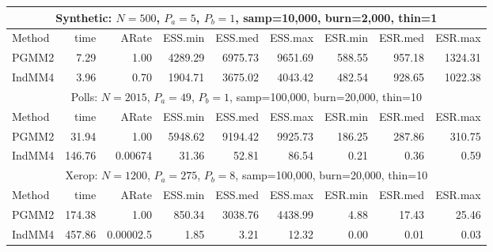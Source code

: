 \documentclass[11pt]{article}
\newcommand{\tablesize}{\small}
\begin{document}
\begin{table}
\tablesize
\centering
\label{tab:mm-examples}
\begin{tabular}{l r r r r r r r r } 
\hline
\multicolumn{9}{c}{Synthetic: $N=500$, $P_a=5$, $P_b=1$, samp=10,000, burn=2,000, thin=1} \\
\hline
Method  &     time &    ARate &  ESS.min &  ESS.med &  ESS.max &  ESR.min &  ESR.med &  ESR.max \\ 
PGMM2   &     7.29 &     1.00 &  4289.29 &  6975.73 &  9651.69 &   588.55 &   957.18 &  1324.31 \\ 
IndMM4  &     3.96 &     0.70 &  1904.71 &  3675.02 &  4043.42 &   482.54 &   928.65 &  1022.38 \\

\hline
\multicolumn{9}{c}{Polls: $N=2015$, $P_a=49$, $P_b=1$, samp=100,000, burn=20,000, thin=10} \\
\hline
Method  &     time &    ARate &  ESS.min &  ESS.med &  ESS.max &  ESR.min &  ESR.med &  ESR.max \\ 
 PGMM2  &    31.94 &     1.00 &  5948.62 &  9194.42 &  9925.73 &   186.25 &   287.86 &   310.75 \\ 
IndMM4  &   146.76 &  0.00674 &    31.36 &    52.81 &    86.54 &     0.21 &     0.36 &     0.59 \\


\hline
\multicolumn{9}{c}{Xerop: $N=1200$, $P_a=275$, $P_b=8$, samp=100,000, burn=20,000, thin=10} \\
\hline
Method  &     time &     ARate &  ESS.min &  ESS.med &  ESS.max &  ESR.min &  ESR.med &  ESR.max \\ 
 PGMM2  &   174.38 &      1.00 &   850.34 &  3038.76 &  4438.99 &     4.88 &    17.43 &    25.46 \\ 
IndMM4  &   457.86 & 0.00002.5 &     1.85 &     3.21 &    12.32 &     0.00 &     0.01 &     0.03
\end{tabular}


\end{table}
\end{document}
